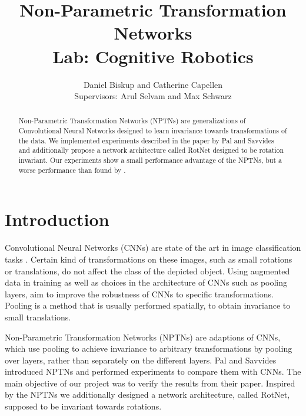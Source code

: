 \documentclass{llncs}
\begin{document}
\pagestyle{headings}  %
%
\mainmatter              %
%
\title{Non-Parametric Transformation Networks \\Lab: Cognitive Robotics}
%
%  
%

\author{Daniel Biskup and Catherine Capellen
 \\Supervisors: Arul Selvam and Max Schwarz}
%
%
%

\maketitle              %
\begin{abstract} Non-Parametric Transformation Networks (NPTNs) are generalizations of Convolutional Neural Networks designed to learn invariance towards transformations of the data. 
We implemented experiments described in the paper by Pal and Savvides \cite{NPTN18} and additionally propose a network architecture called RotNet designed to be rotation invariant. Our experiments show a small performance advantage of the NPTNs, but a worse performance than found by \cite{NPTN18}.

\end{abstract}
\section{Introduction}
Convolutional Neural Networks (CNNs) are state of the art in image classification tasks \cite{Goodfellow-et-al-2016}. Certain kind of transformations on these images, such as small rotations or translations, do not affect the class of the depicted object.  
Using augmented data in training as well as choices in the architecture of CNNs such as pooling layers, aim to improve the robustness of CNNs to specific transformations. 
Pooling is a method that is usually performed spatially, to obtain invariance to small translations. 

Non-Parametric Transformation Networks (NPTNs) are adaptions of CNNs, which use pooling to achieve invariance to arbitrary transformations by pooling over layers, rather than separately on the different layers.
Pal and Savvides \cite{NPTN18} introduced NPTNs and performed experiments to compare them with CNNs. The main objective of our project was to verify the results from their paper. 
Inspired by the NPTNs we additionally designed a network architecture, called RotNet, supposed to be invariant towards rotations.
\end{document}
